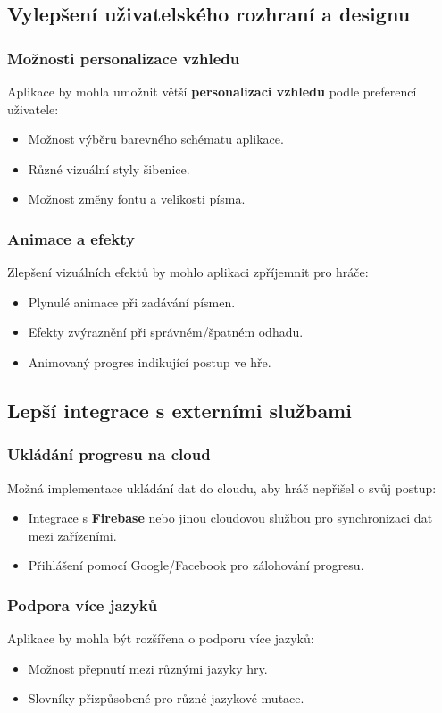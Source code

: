 \documentclass[a4paper,12pt]{article}
\begin{document}
\subsection{Vylepšení uživatelského rozhraní a designu}

\subsubsection{Možnosti personalizace vzhledu}
Aplikace by mohla umožnit větší \textbf{personalizaci vzhledu} podle preferencí uživatele:
\begin{itemize}
    \item Možnost výběru barevného schématu aplikace.
    \item Různé vizuální styly šibenice.
    \item Možnost změny fontu a velikosti písma.
\end{itemize}

\subsubsection{Animace a efekty}
Zlepšení vizuálních efektů by mohlo aplikaci zpříjemnit pro hráče:
\begin{itemize}
    \item Plynulé animace při zadávání písmen.
    \item Efekty zvýraznění při správném/špatném odhadu.
    \item Animovaný progres indikující postup ve hře.
\end{itemize}

\subsection{Lepší integrace s externími službami}

\subsubsection{Ukládání progresu na cloud}
Možná implementace ukládání dat do cloudu, aby hráč nepřišel o svůj postup:
\begin{itemize}
    \item Integrace s \textbf{Firebase} nebo jinou cloudovou službou pro synchronizaci dat mezi zařízeními.
    \item Přihlášení pomocí Google/Facebook pro zálohování progresu.
\end{itemize}

\subsubsection{Podpora více jazyků}
Aplikace by mohla být rozšířena o podporu více jazyků:
\begin{itemize}
    \item Možnost přepnutí mezi různými jazyky hry.
    \item Slovníky přizpůsobené pro různé jazykové mutace.
\end{itemize}
\end{document}
